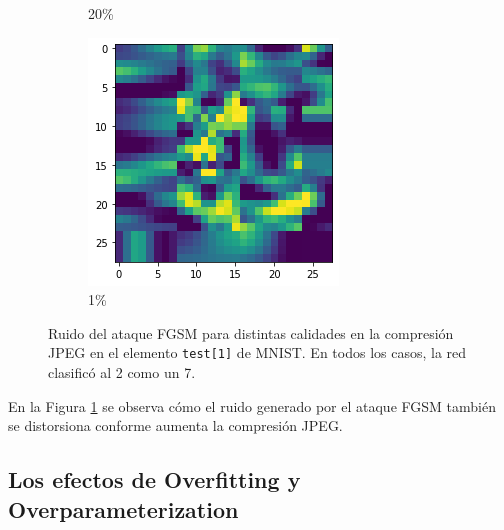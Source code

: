 \begin{figure}[h!]
\begin{subfigure}[t]{0.22\textwidth}
    \caption{20\%}
\end{subfigure}
\hspace{1em}
\begin{subfigure}[t]{0.22\textwidth}
\centering
    \includegraphics[width=\textwidth]{images/jpeg/fgsm_jpeg1_Le.png}
    \caption{1\%}
\end{subfigure}
\caption{Ruido del ataque FGSM para distintas calidades en la compresión JPEG en el elemento \texttt{test[1]} de MNIST. En todos los casos, la red clasificó al 2 como un 7.}
\label{Noise}
\end{figure}

En la Figura \ref{Noise} se observa cómo el ruido generado por el ataque FGSM también se distorsiona conforme aumenta la compresión JPEG.



\subsection{Los efectos de Overfitting y Overparameterization}

